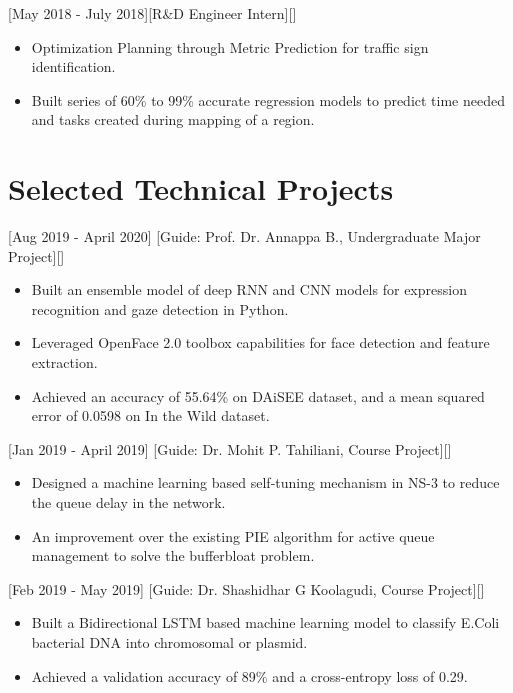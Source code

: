 \documentclass{article}
\begin{document}
[May 2018 - July 2018][R\&D Engineer Intern][]

\begin{itemize}
\item Optimization Planning through Metric Prediction for traffic sign identification. 
\item Built series of 60\% to 99\% accurate regression models to predict time needed and tasks created during mapping of a region.

\end{itemize}


\section{Selected Technical Projects}

[Aug 2019 - April 2020]
[Guide: Prof. Dr. Annappa B., Undergraduate Major Project][]
\begin{itemize}
\item Built an ensemble model of deep RNN and CNN models for expression recognition and gaze detection in Python.
\item Leveraged OpenFace 2.0 toolbox capabilities for face detection and feature extraction.
\item Achieved an accuracy of 55.64\% on DAiSEE dataset, and a mean squared error of 0.0598 on In the Wild dataset.
\end{itemize}

[Jan 2019 - April 2019]
[Guide: Dr. Mohit P. Tahiliani, Course Project][]
\begin{itemize}
\item Designed a machine learning based self-tuning mechanism in NS-3 to reduce the queue delay in the network. 
\item An improvement over the existing PIE algorithm for active queue management to solve the bufferbloat problem.
\end{itemize}

[Feb 2019 - May 2019]
[Guide: Dr. Shashidhar G Koolagudi, Course Project][]
\begin{itemize}
\item Built a Bidirectional LSTM based machine learning model to classify E.Coli bacterial DNA into chromosomal or plasmid.
\item Achieved a validation accuracy of 89\% and a cross-entropy loss of 0.29.
\end{itemize}
\end{document}

